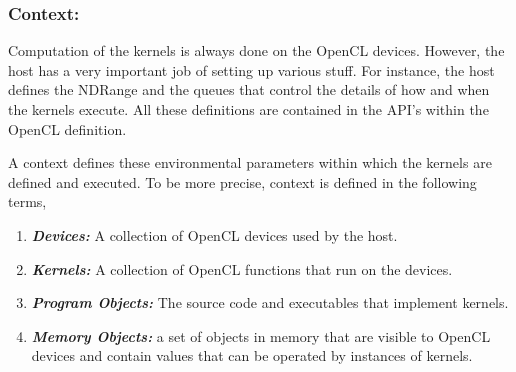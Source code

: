 \documentclass[10pt]{article}
\begin{document}
\subsubsection{Context:}
Computation of the kernels is always done on the OpenCL devices. However, the host has a very important job of setting up various stuff. For instance, the host defines the NDRange and the queues that control the details of how and when the kernels execute. All these definitions are contained in the API's within the OpenCL definition.

A context defines these environmental parameters within which the kernels are defined and executed. To be more precise, context is defined in the following terms,

\begin{enumerate}
	\item \textit{\textbf{Devices:}} A collection of OpenCL devices used by the host.
	\item \textit{\textbf{Kernels:}} A collection of OpenCL functions that run on the devices.
	\item \textit{\textbf{Program Objects:}} The source code and executables that implement kernels.
	\item \textit{\textbf{Memory Objects:}} a set of objects in memory that are visible to OpenCL devices and contain values that can be operated by instances of kernels.
\end{enumerate}
\end{document}
